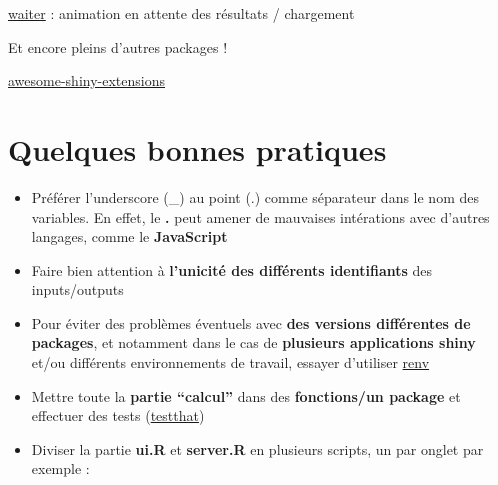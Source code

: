 \documentclass[
]{article}
\newenvironment{Shaded}{\begin{snugshade}}{\end{snugshade}}
\newcommand{\AttributeTok}[1]{\textcolor[rgb]{0.13,0.29,0.53}{#1}}
\newcommand{\CommentTok}[1]{\textcolor[rgb]{0.56,0.35,0.01}{\textit{#1}}}
\newcommand{\ConstantTok}[1]{\textcolor[rgb]{0.56,0.35,0.01}{#1}}
\newcommand{\ControlFlowTok}[1]{\textcolor[rgb]{0.13,0.29,0.53}{\textbf{#1}}}
\newcommand{\FunctionTok}[1]{\textcolor[rgb]{0.13,0.29,0.53}{\textbf{#1}}}
\newcommand{\NormalTok}[1]{#1}
\newcommand{\SpecialCharTok}[1]{\textcolor[rgb]{0.81,0.36,0.00}{\textbf{#1}}}
\newcommand{\StringTok}[1]{\textcolor[rgb]{0.31,0.60,0.02}{#1}}
\providecommand{\tightlist}{%
  \setlength{\itemsep}{0pt}\setlength{\parskip}{0pt}}
\begin{document}
\href{https://waiter.john-coene.com/\#/}{waiter} : animation en attente
des résultats / chargement

Et encore pleins d'autres packages !

\href{https://github.com/nanxstats/awesome-shiny-extensions}{awesome-shiny-extensions}

\hypertarget{quelques-bonnes-pratiques}{%
\section{Quelques bonnes pratiques}\label{quelques-bonnes-pratiques}}

\begin{itemize}
\tightlist
\item
  Préférer l'underscore (\_) au point (.) comme séparateur dans le nom
  des variables. En effet, le \textbf{.} peut amener de mauvaises
  intérations avec d'autres langages, comme le \textbf{JavaScript}
\item
  Faire bien attention à \textbf{l'unicité des différents identifiants}
  des inputs/outputs
\item
  Pour éviter des problèmes éventuels avec \textbf{des versions
  différentes de packages}, et notamment dans le cas de
  \textbf{plusieurs applications shiny} et/ou différents environnements
  de travail, essayer d'utiliser
  \href{https://rstudio.github.io/renv/articles/renv.html}{renv}
\item
  Mettre toute la \textbf{partie ``calcul''} dans des
  \textbf{fonctions/un package} et effectuer des tests
  (\href{http://r-pkgs.had.co.nz/tests.html}{testthat})
\item
  Diviser la partie \textbf{ui.R} et \textbf{server.R} en plusieurs
  scripts, un par onglet par exemple :
\end{itemize}

\begin{Shaded}
\end{Shaded}
\end{document}
